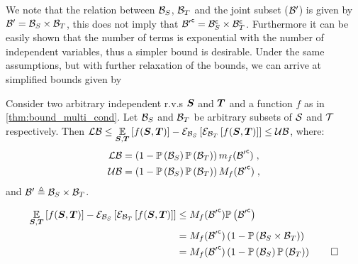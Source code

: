 We note that the relation between $\subSpaceI{\variable}$, $\subSpaceI{\variableI}$ and the joint subset ($\subSpace^\prime$) is given by $\subSpace^\prime=\subSpaceI{\variable}\times\subSpaceI{\variableI}$, this does not imply that $\stcomp{\subSpace^\prime}=\stcompI{\subSpace}{\variable}\times\stcompI{\subSpace}{\variableI}$. Furthermore it can be easily shown that the number of terms is exponential with the number of independent variables, thus a simpler bound is desirable. Under the same assumptions, but with further relaxation of the bounds, we can arrive at simplified bounds given by

\begin{propositionE}
	\label{thm:bound_multi_ind_2}
	Consider two arbitrary independent r.v.s $\RV$ and $\RVI$ and a function $f$ as in \cref{thm:bound_multi_cond}. Let $\subSpaceI{\variable}$ and $\subSpaceI{\variableI}$ be arbitrary subsets of $\Space$ and $\SpaceI$ respectively. Then $\lowerbound\leq\expectation{f(\RV,\RVI)}{\RV,\RVI}-\partialexpectation{\partialexpectation{f(\RV,\RVI)}{\subSpaceI{\variableI}}}{\subSpaceI{\variable}}\leq\upperbound$, where:
	\begin{subequations}
		\begin{align}
			\lowerbound & = \left(1-\measure{\subSpaceI{\variable}}\measure{\subSpaceI{\variableI}}\right)m_f(\stcomp{\subSpace^\prime})\;, \\
			\upperbound & = \left(1-\measure{\subSpaceI{\variable}}\measure{\subSpaceI{\variableI}}\right)M_f(\stcomp{\subSpace^\prime})\;,
		\end{align}
	\end{subequations}
	and $\subSpace^\prime\triangleq\subSpaceI{\variable}\times\subSpaceI{\variableI}$.
\end{propositionE}
\begin{proofE}
	\begin{align*}
		\expectation{f(\RV,\RVI)}{\RV,\RVI}-\partialexpectation{\partialexpectation{f(\RV,\RVI)}{\subSpaceI{\variableI}}}{\subSpaceI{\variable}} & \leq M_f(\stcomp{\subSpace^\prime})\measure{\stcomp{\subSpace^\prime}}                                            \\
		& =M_f(\stcomp{\subSpace^\prime})\left(1-\measure{\subSpaceI{\variable}\times\subSpaceI{\variableI}}\right)         \\
		& =M_f(\stcomp{\subSpace^\prime})\left(1-\measure{\subSpaceI{\variable}}\measure{\subSpaceI{\variableI}}\right)\qed
	\end{align*}
\end{proofE}

